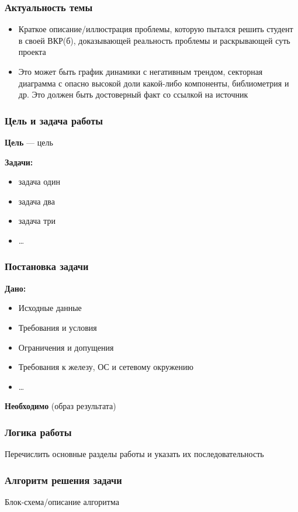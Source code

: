 \documentclass[pdf, hyperref={unicode}, aspectratio=169]{beamer}
\begin{document}
\frame{\titlepage}

\begin{frame}
\frametitle{Актуальность темы}

\begin{itemize}
	\item Краткое описание/иллюстрация проблемы, которую пытался решить студент в своей ВКР(б), доказывающей реальность проблемы и раскрывающей суть проекта
	\item Это может быть график динамики с негативным трендом, секторная диаграмма с опасно высокой доли какой-либо компоненты, библиометрия и др. Это должен быть достоверный факт со ссылкой на источник
\end{itemize}
\end{frame}


\begin{frame}
\frametitle{Цель и задача работы}

\textbf{Цель} --- \alert{цель}

\textbf{Задачи:}
\begin{itemize}
	\item задача один
	\item задача два
	\item задача три
	\item …
\end{itemize}
\end{frame}


\begin{frame}
\frametitle{Постановка задачи}

\textbf{Дано:}
\begin{itemize}
	\item Исходные данные
	\item Требования и условия
	\item Ограничения и допущения
	\item Требования к железу, ОС и сетевому окружению
	\item …
\end{itemize}

\textbf{Необходимо} (образ результата)
\end{frame}


\begin{frame}
\frametitle{Логика работы}

Перечислить основные разделы работы и указать их последовательность
\end{frame}


\begin{frame}
\frametitle{Алгоритм решения задачи}

Блок-схема/описание алгоритма 
\end{frame}
\end{document}
